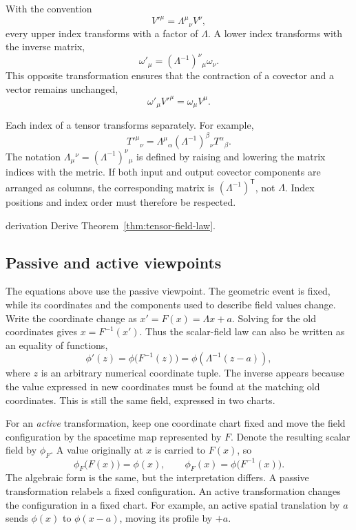 \documentclass[11pt,a4paper]{article}
\newcommand{\transpose}{\mathsf{T}}
\begin{document}
\begin{precision}
With the convention
\[
  V'^\mu=\Lambda^\mu{}_\nu V^\nu,
\]
every upper index transforms with a factor of \(\Lambda\). A lower index
transforms with the inverse matrix,
\[
  \omega'_\mu
  =(\Lambda^{-1})^\nu{}_\mu\omega_\nu.
\]
This opposite transformation ensures that the contraction of a covector and a
vector remains unchanged,
\[
  \omega'_\mu V'^\mu=\omega_\mu V^\mu.
\]

Each index of a tensor transforms separately. For example,
\[
  T'^\mu{}_\nu
  =
  \Lambda^\mu{}_\alpha
  (\Lambda^{-1})^\beta{}_\nu
  T^\alpha{}_\beta.
\]
The notation \(\Lambda_\mu{}^\nu=(\Lambda^{-1})^\nu{}_\mu\) is defined by
raising and lowering the matrix indices with the metric. If both input and
output covector components are arranged as columns, the corresponding matrix
is \((\Lambda^{-1})^{\transpose}\), not \(\Lambda\). Index positions and
index order must therefore be respected.
\end{precision}

\begin{studentwork}[height=9.5cm]{derivation}
Derive Theorem~\ref{thm:tensor-field-law}.
\end{studentwork}

\subsection{Passive and active viewpoints}

The equations above use the passive viewpoint. The geometric event is fixed,
while its coordinates and the components used to describe field values change.
Write the coordinate change as \(x'=F(x)=\Lambda x+a\). Solving for the old
coordinates gives \(x=F^{-1}(x')\). Thus the scalar-field law can also be
written as an equality of functions,
\[
  \phi'(z)=\phi\bigl(F^{-1}(z)\bigr)
  =\phi\!\left(\Lambda^{-1}(z-a)\right),
\]
where \(z\) is an arbitrary numerical coordinate tuple. The inverse appears
because the value expressed in new coordinates must be found at the matching
old coordinates. This is still the same field, expressed in two charts.

For an \emph{active} transformation, keep one coordinate chart fixed and move
the field configuration by the spacetime map represented by \(F\). Denote
the resulting scalar field by \(\phi_F\). A value originally at \(x\) is
carried to \(F(x)\), so
\[
  \phi_F\bigl(F(x)\bigr)=\phi(x),
  \qquad
  \phi_F(x)=\phi\bigl(F^{-1}(x)\bigr).
\]
The algebraic form is the same, but the interpretation differs. A passive
transformation relabels a fixed configuration. An active transformation
changes the configuration in a fixed chart. For example, an active spatial
translation by \(a\) sends \(\phi(x)\) to \(\phi(x-a)\), moving its profile
by \(+a\).
\end{document}
